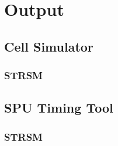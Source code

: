 \chapter{Output}
\prepchapter
\section{Cell Simulator}

\subsection{STRSM}
\label{app:strsm}



\section{SPU Timing Tool}

\subsection{STRSM}
\label{app:strsmtime}


